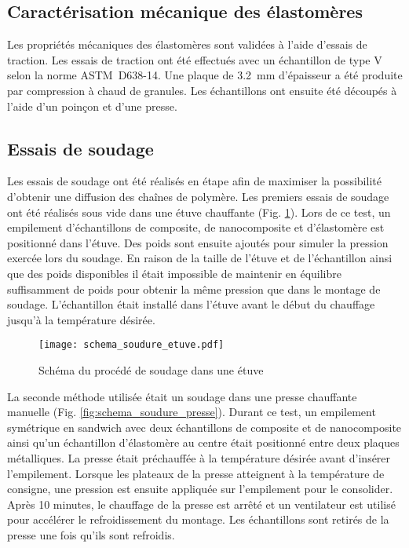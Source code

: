 \subsection{Caractérisation mécanique des élastomères}

Les propriétés mécaniques des élastomères sont validées à l'aide d'essais de traction. 
Les essais de traction ont été effectués avec un échantillon de type V selon la norme ASTM~D638-14. 
Une plaque de \SI[locale=FR]{3.2}{\milli\metre} d'épaisseur a été produite par compression à chaud de granules. 
Les échantillons ont ensuite été découpés à l'aide d'un poinçon et d'une presse. 

\subsection{Essais de soudage}

Les essais de soudage ont été réalisés en étape afin de maximiser la possibilité d'obtenir une diffusion des chaînes de polymère. 
Les premiers essais de soudage ont été réalisés sous vide dans une étuve chauffante (Fig. \ref{fig:schema_soudure_etuve}). 
Lors de ce test, un empilement d'échantillons de composite, de nanocomposite et d'élastomère est positionné dans l'étuve. 
Des poids sont ensuite ajoutés pour simuler la pression exercée lors du soudage. 
En raison de la taille de l'étuve et de l'échantillon ainsi que des poids disponibles il était impossible de maintenir en équilibre suffisamment de poids pour obtenir la même pression que dans le montage de soudage. 
L'échantillon était installé dans l'étuve avant le début du chauffage jusqu'à la température désirée. 

\begin{figure}[h]
	\centering
	\texttt{[image: schema\_soudure\_etuve.pdf]}
	\caption{Schéma du procédé de soudage dans une étuve}
	\label{fig:schema_soudure_etuve}
\end{figure}

La seconde méthode utilisée était un soudage dans une presse chauffante manuelle (Fig. \ref{fig:schema_soudure_presse}). 
Durant ce test, un empilement symétrique en sandwich avec deux échantillons de composite et de nanocomposite ainsi qu'un échantillon d'élastomère au centre était positionné entre deux plaques métalliques. 
La presse était préchauffée à la température désirée avant d'insérer l'empilement. 
Lorsque les plateaux de la presse atteignent à la température de consigne, une pression est ensuite appliquée sur l'empilement pour le consolider. 
Après 10 minutes, le chauffage de la presse est arrêté et un ventilateur est utilisé pour accélérer le refroidissement du montage. 
Les échantillons sont retirés de la presse une fois qu'ils sont refroidis. 

